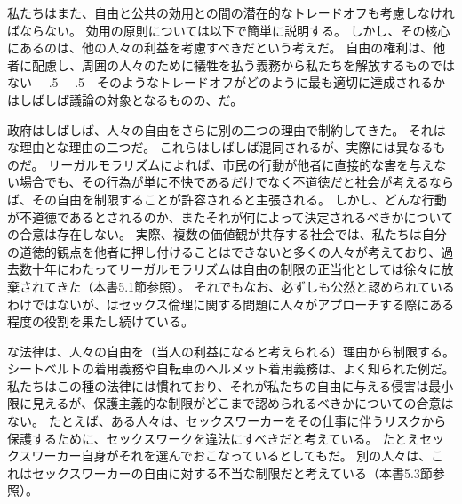 \documentclass[paper=a4,book,openany]{jlreq}
\def\DDASH{―\kern-.5\zw―\kern-.5\zw―} %
\begin{document}
私たちはまた、自由と公共の効用との間の潜在的なトレードオフも考慮しなければならない。
効用の原則については以下で簡単に説明する。
しかし、その核心にあるのは、他の人々の利益を考慮すべきだという考えだ。
自由の権利は、他者に配慮し、周囲の人々のために犠牲を払う義務から私たちを解放するものではない{\DDASH}そのようなトレードオフがどのように最も適切に達成されるかはしばしば議論の対象となるものの、だ。

政府はしばしば、人々の自由をさらに別の二つの理由で制約してきた。
それはな理由とな理由の二つだ。
これらはしばしば混同されるが、実際には異なるものだ。
リーガルモラリズムによれば、市民の行動が他者に直接的な害を与えない場合でも、その行為が単に不快であるだけでなく不道徳だと社会が考えるならば、その自由を制限することが許容されると主張される。
しかし、どんな行動が不道徳であるとされるのか、またそれが何によって決定されるべきかについての合意は存在しない。
実際、複数の価値観が共存する社会では、私たちは自分の道徳的観点を他者に押し付けることはできないと多くの人々が考えており、過去数十年にわたってリーガルモラリズムは自由の制限の正当化としては徐々に放棄されてきた（本書5.1節参照）。
それでもなお、必ずしも公然と認められているわけではないが、はセックス倫理に関する問題に人々がアプローチする際にある程度の役割を果たし続けている。

な法律は、人々の自由を（当人の利益になると考えられる）理由から制限する。
シートベルトの着用義務や自転車のヘルメット着用義務は、よく知られた例だ。
私たちはこの種の法律には慣れており、それが私たちの自由に与える侵害は最小限に見えるが、保護主義的な制限がどこまで認められるべきかについての合意はない。
たとえば、ある人々は、セックスワーカーをその仕事に伴うリスクから保護するために、セックスワークを違法にすべきだと考えている。
たとえセックスワーカー自身がそれを選んでおこなっているとしてもだ。
別の人々は、これはセックスワーカーの自由に対する不当な制限だと考えている（本書5.3節参照）。
\end{document}
